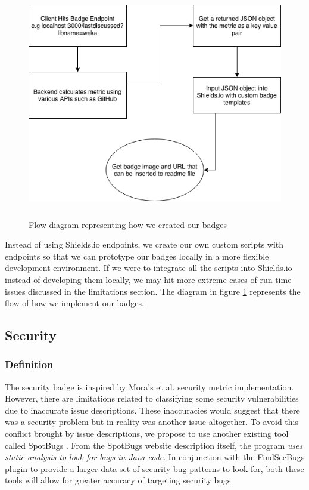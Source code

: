 \documentclass[12pt, letterpaper]{article}
\begin{document}
\begin{figure}[!htb]
    \centerline{
        \includegraphics[width=18cm,height=10cm,keepaspectratio=true]{methods}
    }
    \caption{
        Flow diagram representing how we created our badges
    }
    \label{methods}
\end{figure}

Instead of using Shields.io \cite{shields} endpoints, we create our own custom scripts with endpoints 
so that we can prototype our badges locally in a more flexible development environment.
If we were to integrate all the scripts into Shields.io \cite{shieldsrepo} instead of 
developing them locally, we may hit
more extreme cases of run time issues discussed in the limitations section. 
The diagram in figure \ref{methods} represents the flow of how we implement our badges.


\subsection{Security}
\subsubsection{Definition}
The security badge is inspired by Mora's et al. \cite{metrics} security metric implementation.
However, there are limitations related to classifying some security vulnerabilities due to inaccurate
issue descriptions. These inaccuracies would suggest that there was a security problem but in reality was another issue altogether.
To avoid this conflict brought by issue descriptions, 
we propose to use another existing tool called SpotBugs \cite{spotbugs}.
From the SpotBugs \cite{spotbugs} website description itself, the program \textit{uses static analysis to look for bugs in Java code}.
In conjunction with the FindSecBugs \cite{findsecbugs} plugin to provide a larger data set of security bug patterns to look for, 
both these tools will allow for greater accuracy of targeting security bugs.
\end{document}
